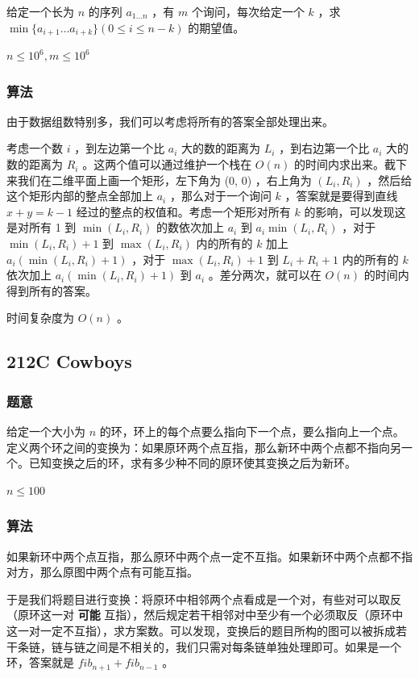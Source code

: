 \documentclass[11pt]{article}
\begin{document}
给定一个长为 $n$ 的序列 $a_{1 \dots n}$ ，有 $m$ 个询问，每次给定一个 $k$ ，求 $\min\{a_{i + 1} \dots a_{i + k}\} (0 \leq i \leq n - k)$ 的期望值。

$n \leq 10^6, m \leq 10^6$
\subsubsection{算法}
\label{sec-12-5-2}

由于数据组数特别多，我们可以考虑将所有的答案全部处理出来。

考虑一个数 $i$ ，到左边第一个比 $a_i$ 大的数的距离为 $L_i$ ，到右边第一个比 $a_i$ 大的数的距离为 $R_i$ 。这两个值可以通过维护一个栈在 $O(n)$ 的时间内求出来。截下来我们在二维平面上画一个矩形，左下角为 (0, 0) ，右上角为 $(L_i, R_i)$ ，然后给这个矩形内部的整点全部加上 $a_i$ ，那么对于一个询问 $k$ ，答案就是要得到直线 $x + y = k - 1$ 经过的整点的权值和。考虑一个矩形对所有 $k$ 的影响，可以发现这是对所有 1 到 $\min(L_i, R_i)$ 的数依次加上 $a_i$ 到 $a_i \min(L_i, R_i)$ ，对于 $\min(L_i, R_i) + 1$ 到 $\max(L_i, R_i)$ 内的所有的 $k$ 加上 $a_i (\min(L_i, R_i) + 1)$ ，对于 $\max(L_i, R_i) + 1$ 到 $L_i + R_i + 1$ 内的所有的 $k$ 依次加上 $a_i (\min(L_i, R_i) + 1)$ 到 $a_i$ 。差分两次，就可以在 $O(n)$ 的时间内得到所有的答案。

时间复杂度为 $O(n)$ 。
\subsection{212C  Cowboys}
\label{sec-12-6}
\subsubsection{题意}
\label{sec-12-6-1}

给定一个大小为 $n$ 的环，环上的每个点要么指向下一个点，要么指向上一个点。定义两个环之间的变换为：如果原环两个点互指，那么新环中两个点都不指向另一个。已知变换之后的环，求有多少种不同的原环使其变换之后为新环。

$n \leq 100$
\subsubsection{算法}
\label{sec-12-6-2}

如果新环中两个点互指，那么原环中两个点一定不互指。如果新环中两个点都不指对方，那么原图中两个点有可能互指。

于是我们将题目进行变换：将原环中相邻两个点看成是一个对，有些对可以取反（原环这一对 \textbf{可能} 互指），然后规定若干相邻对中至少有一个必须取反（原环中这一对一定不互指），求方案数。可以发现，变换后的题目所构的图可以被拆成若干条链，链与链之间是不相关的，我们只需对每条链单独处理即可。如果是一个环，答案就是 $fib_{n + 1} + fib_{n - 1}$ 。
\end{document}
